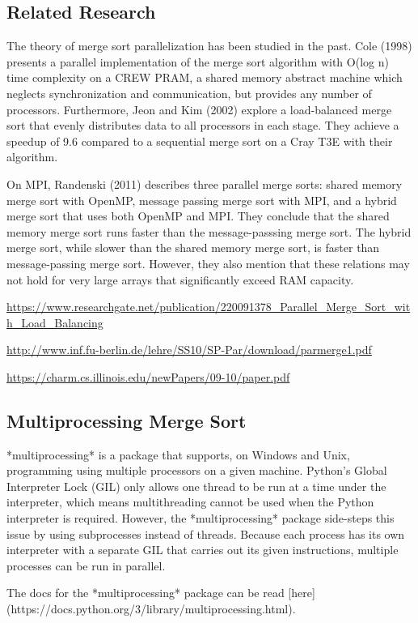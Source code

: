 \subsection{Related Research}

The theory of merge sort parallelization has been studied in the past. Cole (1998) presents a parallel implementation of
the merge sort algorithm with O(log n) time complexity on a CREW PRAM, a shared memory abstract machine which neglects
synchronization and communication, but provides any number of processors. Furthermore, Jeon and Kim (2002) explore a
load-balanced merge sort that evenly distributes data to all processors in each stage. They achieve a speedup of 9.6
compared to a sequential merge sort on a Cray T3E with their algorithm.

On MPI, Randenski (2011) describes three parallel merge sorts: shared memory merge sort with OpenMP, message passing
merge sort with MPI, and a hybrid merge sort that uses both OpenMP and MPI. They conclude that the shared memory merge
sort runs faster than the message-passsing merge sort. The hybrid merge sort, while slower than the shared memory merge
sort, is faster than message-passing merge sort. However, they also mention that these relations may not hold for very
large arrays that significantly exceed RAM capacity.

\url{https://www.researchgate.net/publication/220091378_Parallel_Merge_Sort_with_Load_Balancing}

\url{http://www.inf.fu-berlin.de/lehre/SS10/SP-Par/download/parmerge1.pdf}

\url{https://charm.cs.illinois.edu/newPapers/09-10/paper.pdf}

\subsection{Multiprocessing Merge Sort}

*multiprocessing* is a package that supports, on Windows and Unix, programming using multiple processors on a given
machine. Python's Global Interpreter Lock (GIL) only allows one thread to be run at a time under the interpreter, which
means multithreading cannot be used when the Python interpreter is required. However, the *multiprocessing* package
side-steps this issue by using subprocesses instead of threads. Because each process has its own interpreter with a
separate GIL that carries out its given instructions, multiple processes can be run in parallel.

The docs for the *multiprocessing* package can be read [here](https://docs.python.org/3/library/multiprocessing.html).


